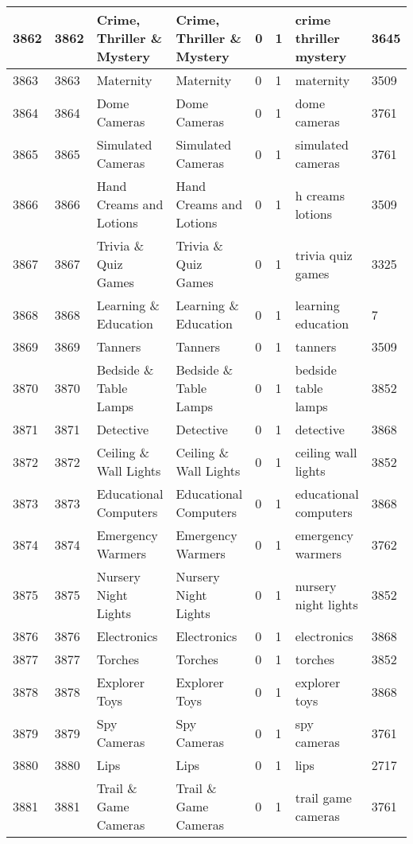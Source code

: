 \begin{longtable}{|l|l|l|l|l|l|l|l|}
3862 & 3862 & Crime, Thriller \& Mystery & Crime, Thriller \& Mystery & 0 & 1 & crime thriller mystery & 3645 \\ \hline 
3863 & 3863 & Maternity & Maternity & 0 & 1 & maternity & 3509 \\ \hline 
3864 & 3864 & Dome Cameras & Dome Cameras & 0 & 1 & dome cameras & 3761 \\ \hline 
3865 & 3865 & Simulated Cameras & Simulated Cameras & 0 & 1 & simulated cameras & 3761 \\ \hline 
3866 & 3866 & Hand Creams and Lotions & Hand Creams and Lotions & 0 & 1 & h creams lotions & 3509 \\ \hline 
3867 & 3867 & Trivia \& Quiz Games & Trivia \& Quiz Games & 0 & 1 & trivia quiz games & 3325 \\ \hline 
3868 & 3868 & Learning \& Education & Learning \& Education & 0 & 1 & learning education & 7 \\ \hline 
3869 & 3869 & Tanners & Tanners & 0 & 1 & tanners & 3509 \\ \hline 
3870 & 3870 & Bedside \& Table Lamps & Bedside \& Table Lamps & 0 & 1 & bedside table lamps & 3852 \\ \hline 
3871 & 3871 & Detective & Detective & 0 & 1 & detective & 3868 \\ \hline 
3872 & 3872 & Ceiling \& Wall Lights & Ceiling \& Wall Lights & 0 & 1 & ceiling wall lights & 3852 \\ \hline 
3873 & 3873 & Educational Computers & Educational Computers & 0 & 1 & educational computers & 3868 \\ \hline 
3874 & 3874 & Emergency Warmers & Emergency Warmers & 0 & 1 & emergency warmers & 3762 \\ \hline 
3875 & 3875 & Nursery Night Lights & Nursery Night Lights & 0 & 1 & nursery night lights & 3852 \\ \hline 
3876 & 3876 & Electronics & Electronics & 0 & 1 & electronics & 3868 \\ \hline 
3877 & 3877 & Torches & Torches & 0 & 1 & torches & 3852 \\ \hline 
3878 & 3878 & Explorer Toys & Explorer Toys & 0 & 1 & explorer toys & 3868 \\ \hline 
3879 & 3879 & Spy Cameras & Spy Cameras & 0 & 1 & spy cameras & 3761 \\ \hline 
3880 & 3880 & Lips & Lips & 0 & 1 & lips & 2717 \\ \hline 
3881 & 3881 & Trail \& Game Cameras & Trail \& Game Cameras & 0 & 1 & trail game cameras & 3761 \\ \hline 

\end{longtable}
